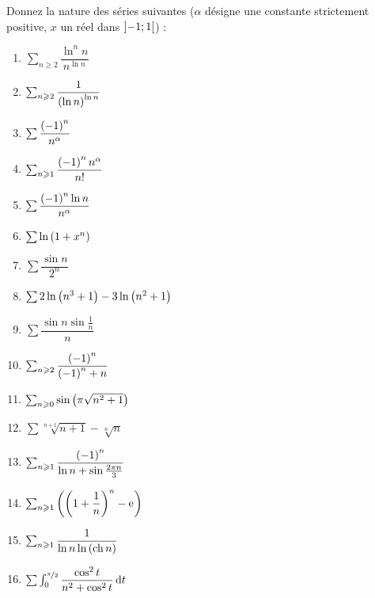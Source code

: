\begin{exoss}[Exercice 3]
Donnez la nature des séries suivantes (\(\alpha\) désigne une constante strictement positive, \(x\) un réel dans \(\left]-1;1\right[\)) :

\begin{enumerate}
    \item \(\sum_{n\geq2}\dfrac{\ln^nn}{n^{\ln n}}\) \\
    \item \(\sum_{n\geqslant2}\dfrac{1}{\left(\ln n\right)^{\ln n}}\) \\
    \item \(\sum\dfrac{\left(-1\right)^n}{n^\alpha}\) \\
    \item \(\sum_{n\geqslant1}\dfrac{\left(-1\right)^nn^\alpha}{n!}\) \\
    \item \(\sum\dfrac{\left(-1\right)^n\ln n}{n^\alpha}\) \\
    \item \(\sum\ln\left(1+x^n\right)\) \\
    \item \(\sum\dfrac{\sin n}{2^n}\) \\
    \item \(\sum2\ln\left(n^3+1\right)-3\ln\left(n^2+1\right)\) \\
    \item \(\sum\dfrac{\sin n\sin\frac{1}{n}}{n}\) \\
    \item \(\sum_{n\geqslant2}\dfrac{\left(-1\right)^n}{\left(-1\right)^n+n}\) \\
    \item \(\sum_{n\geqslant0}\sin\left(\pi\sqrt{n^2+1}\right)\) \\
    \item \(\sum\sqrt[n+1]{n+1}-\sqrt[n]{n}\) \\
    \item \(\sum_{n\geqslant1}\dfrac{\left(-1\right)^n}{\ln n+\sin\frac{2\pi n}{3}}\) \\
    \item \(\sum_{n\geqslant1}\left(\left(1+\dfrac{1}{n}\right)^n-\mathrm{e}^{}\right)\) \\
    \item \(\sum_{n\geqslant1}\dfrac{1}{\ln n\ln\left(\operatorname{ch} n\right)}\) \\
    \item \(\sum\int_0^{\nicefrac{\pi}{2}}\dfrac{\cos^2t}{n^2+\cos^2t}\odif{t}\)
\end{enumerate}
\end{exoss}



